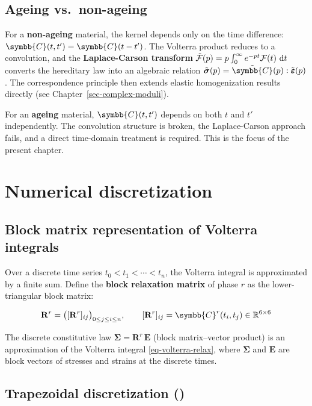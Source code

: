 \documentclass[
  a4paper,
  numbers=noendperiod,
  DIV=12]{scrreprt}
\newcommand{\uuuu}[1]{{\symbb{{#1}}}}
\newcommand{\ud}{{\,\mathrm{d}}}
\begin{document}
\subsection{Ageing vs.~non-ageing}\label{ageing-vs.-non-ageing}

For a \textbf{non-ageing} material, the kernel depends only on the time
difference: \(\uuuu{C}(t,t') = \uuuu{C}(t-t')\). The Volterra product
reduces to a convolution, and the \textbf{Laplace-Carson transform}
\(\tilde{\cal F}(p) = p\int_0^\infty e^{-pt}{\cal F}(t)\,\ud t\)
converts the hereditary law into an algebraic relation
\(\tilde{\boldsymbol{\sigma}}(p) = \tilde{\uuuu{C}}(p):\tilde{\boldsymbol{\varepsilon}}(p)\).
The correspondence principle then extends elastic homogenization results
directly (see Chapter~\ref{sec-complex-moduli}).

For an \textbf{ageing} material, \(\uuuu{C}(t,t')\) depends on both
\(t\) and \(t'\) independently. The convolution structure is broken, the
Laplace-Carson approach fails, and a direct time-domain treatment is
required. This is the focus of the present chapter.

\section{Numerical discretization}\label{sec-visco-discretization}

\subsection{Block matrix representation of Volterra
integrals}\label{block-matrix-representation-of-volterra-integrals}

Over a discrete time series \(t_0 < t_1 < \cdots < t_n\), the Volterra
integral is approximated by a finite sum. Define the \textbf{block
relaxation matrix} of phase \(r\) as the lower-triangular block matrix:

\[
\mathbf{R}^r = \bigl([\mathbf{R}^r]_{ij}\bigr)_{0\le j\le i\le n},
\qquad [\mathbf{R}^r]_{ij} = \uuuu{C}^r(t_i,t_j) \in \mathbb{R}^{6\times 6}
\]

The discrete constitutive law
\(\boldsymbol{\Sigma} = \mathbf{R}^r\,\boldsymbol{E}\) (block
matrix--vector product) is an approximation of the Volterra integral
\ref{eq-volterra-relax}, where \(\boldsymbol{\Sigma}\) and
\(\boldsymbol{E}\) are block vectors of stresses and strains at the
discrete times.

\subsection{\texorpdfstring{Trapezoidal discretization
()}{Trapezoidal discretization (Julien Sanahuja, 2013)}}\label{trapezoidal-discretization-sanahuja2013}
\end{document}
